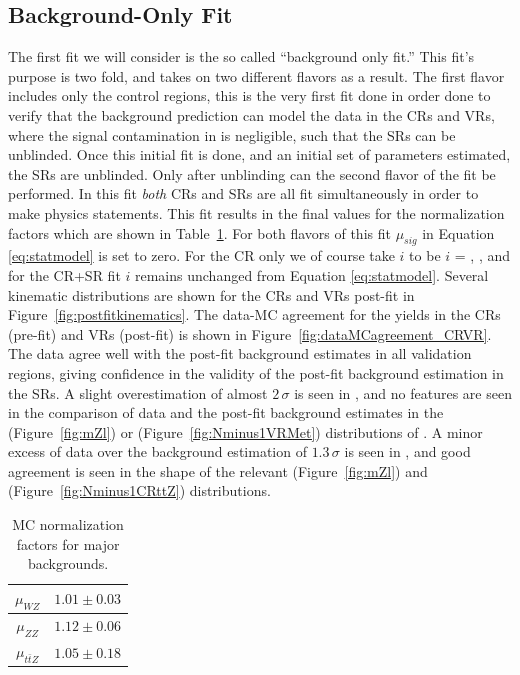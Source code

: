 \subsection{Background-Only Fit}
\label{sec:stats:bkgonly}
The first fit we will consider is the so called ``background only fit.''
This fit's purpose is two fold, and takes on two different flavors as a result.
The first flavor includes only the control regions, this is the very first fit done in order done to verify that the background prediction can model the data in the CRs and VRs, where the signal contamination in is negligible, such that the SRs can be unblinded.
Once this initial fit is done, and an initial set of parameters estimated, the SRs are unblinded.
Only after unblinding can the second flavor of the fit be performed.
In this fit \emph{both} CRs and SRs are all fit simultaneously in order to make physics statements.
This fit results in the final values for the normalization factors which are shown in Table~\ref{tab:normfactors}.
For both flavors of this fit $\mu_{sig}$ in Equation \ref{eq:statmodel} is set to zero.
For the CR only we of course take $i$ to be $i$ = \CRttZ, \CRWZ, \CRZZ and for the CR+SR fit $i$ remains unchanged from Equation \ref{eq:statmodel}.
Several kinematic distributions are shown for the CRs and VRs post-fit in Figure~\ref{fig:postfitkinematics}.
The data-MC agreement for the yields in the CRs (pre-fit) and VRs (post-fit) is shown in Figure~\ref{fig:dataMCagreement_CRVR}.
The data agree well with the post-fit background estimates in all validation regions, giving confidence in the validity of the post-fit background estimation in the SRs.
A slight overestimation of almost $2\,\sigma$ is seen in \VRmet, and no features are seen in the comparison of data and the post-fit background estimates in the \mZl (Figure~\ref{fig:mZl}) or \met (Figure~\ref{fig:Nminus1VRMet}) distributions of \VRmet.
A minor excess of data over the background estimation of $1.3\,\sigma$ is seen in \VRttZ, and good agreement is seen in the shape of the relevant \mZl (Figure~\ref{fig:mZl}) and \dRbb (Figure~\ref{fig:Nminus1CRttZ}) distributions.

\begin{table}[h]
    \centering
    \begin{tabular}{c|c}
    \toprule
         $\mu_{WZ}$ & $1.01\pm0.03$ \\
         \midrule
         $\mu_{ZZ}$ & $1.12\pm0.06$ \\ 
         \midrule
         $\mu_{t\bar{t}Z}$ & $1.05\pm0.18$ \\ 
         \bottomrule
    \end{tabular}
    \caption{MC normalization factors for major backgrounds.}
    \label{tab:normfactors}
\end{table}

